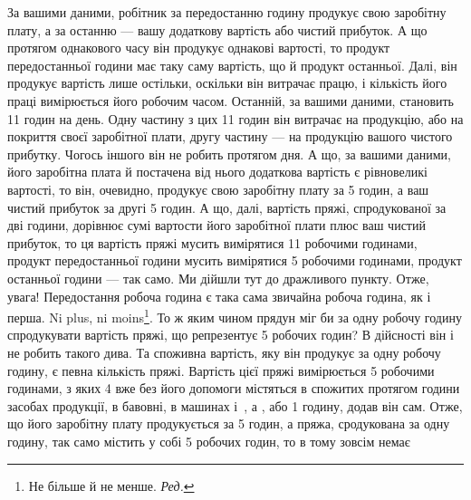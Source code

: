 За вашими даними, робітник за передостанню годину продукує свою заробітну плату, а за останню — вашу
додаткову вартість або чистий прибуток. А що протягом однакового часу він продукує
однакові вартості, то продукт передостанньої години має таку
саму вартість, що й продукт останньої. Далі, він продукує вартість лише остільки, оскільки він
витрачає працю, і кількість
його праці вимірюється його робочим часом. Останній, за вашими даними, становить 11 годин на
день. Одну частину з цих 11 годин
він витрачає на продукцію, або на покриття своєї заробітної плати, другу частину — на продукцію
вашого чистого прибутку. Чогось іншого він не робить протягом дня. А що, за вашими даними, його
заробітна плата й постачена від нього додаткова вартість є рівновеликі вартості, то він, очевидно,
продукує свою заробітну плату за 5 годин, а ваш чистий прибуток за другі
5 годин. А що, далі, вартість пряжі, спродукованої за дві години, дорівнює сумі вартости його
заробітної плати плюс ваш
чистий прибуток, то ця вартість пряжі мусить вимірятися 11 робочими
годинами, продукт передостанньої години мусить вимірятися 5 робочими годинами, продукт останньої
години — так
само. Ми дійшли тут до дражливого пункту. Отже, увага! Передостання робоча година є така сама
звичайна робоча година, як і
перша. Ni plus, ni moins\footnote*{
Не більше й не менше. \emph{Ред.}
}. То ж яким чином прядун міг би за одну робочу годину спродукувати
вартість пряжі, що репрезентує 5 робочих годин? В дійсності він і не робить такого дива. Та
споживна вартість, яку він продукує за одну робочу годину, є певна кількість пряжі. Вартість цієї
пряжі вимірюється 5 робочими годинами, з яких 4 вже без його допомоги містяться в спожитих
протягом години засобах продукції, в бавовні, в машинах і~, а , або 1 годину, додав він
сам. Отже, що його заробітну плату продукується за 5 годин, а пряжа, сродукована за одну годину,
так само містить у собі 5 робочих годин, то в тому зовсім немає
\parbreak{}  %
